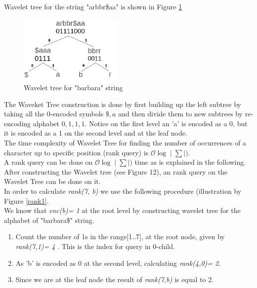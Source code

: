 \documentclass[11pt,a4paper]{report}
\begin{document}
Wavelet tree for the string "arbbr\$aa" is shown in Figure \ref{Wavlet-barbara}
\begin{figure}[H]
\centering
\includegraphics[width=5cm]{pictures/barbara-wavlet2.png}
\caption{Wavelet tree for "barbara" string }
\label{Wavlet-barbara}
\end{figure}

The Waveket Tree construction is done by first building 
up the left subtree by taking all the 0-encoded symbols 
${\$,a}$ and then divide them to new subtrees by re-encoding 
alphabet ${0,1,1,1}$. Notice on the first level an 'a' is 
encoded as a 0, but it is encoded as a 1 on the second 
level and at the leaf node.\\
The time complexity of Wavelet Tree for finding the number
of occurrences of a character up to specific position (rank 
query) is $\mathcal{O}\log{}\mid\sum\mid)$.\\
A rank query can be done on  $\mathcal{O}\log{}\mid\sum\mid)$ time 
as is explained in the following.
After constructing the Wavelet tree (see Figure 12), an 
rank query on the Wavelet Tree can be done on it. 
\\
In order to calculate \emph{rank(7, b)} we use the following 
procedure (illustration by Figure \ref{rank1}.\\
We know that \emph{enc(b)= 1} at the root level by 
constructing wavelet tree for the alphabet of "barbara\$"
string.

\begin{enumerate}

    \item
		 Count the number of 1s in the range[1..7], at the root node, 
		 given by \emph{rank(7,1)= 4 }. This is the index for query in 
		 0-child. 
		 
    \item
		As 'b' is encoded as 0 at the second level, calculating \emph
		{rank(4,0)= 2}. 

    \item
		Since we are at the leaf node the result of \emph{rank(7,b)} is
		equal to 2.
\end{enumerate}
\end{document}
